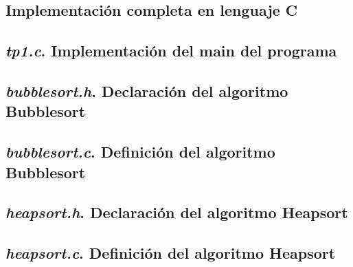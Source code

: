 \documentclass{article}
\begin{document}
\begin{appendices}

\bigskip\bigskip

\section{Implementación completa en lenguaje C}


\subsection{\textit{tp1.c}. Implementación del main del programa}
\lstset{ language = C } %
 
\bigskip\bigskip

\subsection{\textit{bubblesort.h}. Declaración del algoritmo Bubblesort}
\lstset{ language = C } %
 
\bigskip\bigskip

\subsection{\textit{bubblesort.c}. Definición del algoritmo Bubblesort}
\lstset{ language = C } %
 
\bigskip\bigskip

\subsection{\textit{heapsort.h}. Declaración del algoritmo Heapsort}
\lstset{ language = C } %
 
\bigskip\bigskip

\subsection{\textit{heapsort.c}. Definición del algoritmo Heapsort}
\lstset{ language = C } %
 
\newpage




\end{appendices}
\end{document}
